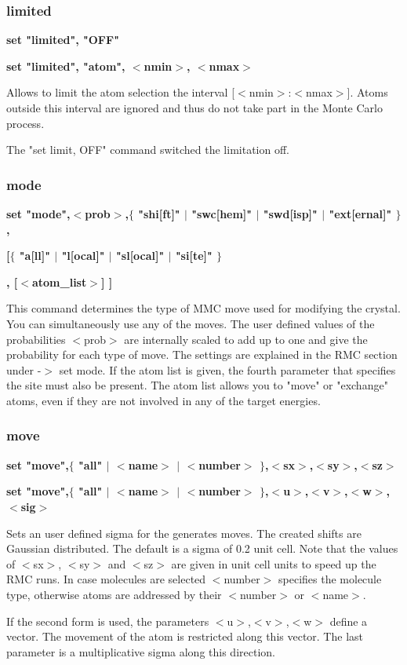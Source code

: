 \subsubsection{limited}
{\bf set "limited", "OFF" \par }
{\bf set "limited", "atom", $ <$nmin$> $, $ <$nmax$> $ \par }
\par
\vspace{3pt}
Allows to limit the atom selection the interval [$ <$nmin$> $:$ <$nmax$> $]. 
Atoms outside this interval are ignored and thus do not take part 
in the Monte Carlo process. 
\par
The "set limit, OFF" command switched the limitation off. 
\subsubsection{mode}
{\bf set "mode",$ <$prob$> $,$ \{$ "shi[ft]" $| $ "swc[hem]" $| $ "swd[isp]" $| $ "ext[ernal]" $\} $, \par }
{\bf           [$ \{$ "a[ll]"   $| $ "l[ocal]"  $| $ "sl[ocal]" $| $ "si[te]"     $\} $ \par }
{\bf            , [$ <$atom\_list$> $] ] \par }
\par
\vspace{3pt}
This command determines the type of MMC move used for modifying 
the crystal. You can simultaneously use any of the moves. The 
user defined values of the probabilities $ <$prob$> $ are internally 
scaled to add up to one and give the probability for each type 
of move. The settings are explained in the RMC section under 
-$> $ set mode. 
If the atom list is given, the fourth parameter that specifies the 
site must also be present. The atom list allows you to "move" or 
"exchange" atoms, even if they are not involved in any of the 
target energies. 
\subsubsection{move}
{\bf set "move",$ \{$ "all" $| $ $ <$name$> $ $| $ $ <$number$> $ $\} $,$ <$sx$> $,$ <$sy$> $,$ <$sz$> $ \par }
{\bf set "move",$ \{$ "all" $| $ $ <$name$> $ $| $ $ <$number$> $ $\} $,$ <$u$> $,$ <$v$> $,$ <$w$> $,  $ <$sig$> $ \par }
\par
\vspace{3pt}
Sets an user defined sigma for the generates moves. The created shifts 
are Gaussian distributed. The default is a sigma of 0.2 unit cell. Note 
that the values of $ <$sx$> $, $ <$sy$> $ and $ <$sz$> $ are given in unit cell units to 
speed up the RMC runs. In case molecules are selected $ <$number$> $ specifies 
the molecule type, otherwise atoms are addressed by their $ <$number$> $ or 
$ <$name$> $. 
\par
If the second form is used, the parameters $ <$u$> $,$ <$v$> $,$ <$w$> $ define a vector. 
The movement of the atom is restricted along this vector. The last 
parameter is a multiplicative sigma along this direction. 
